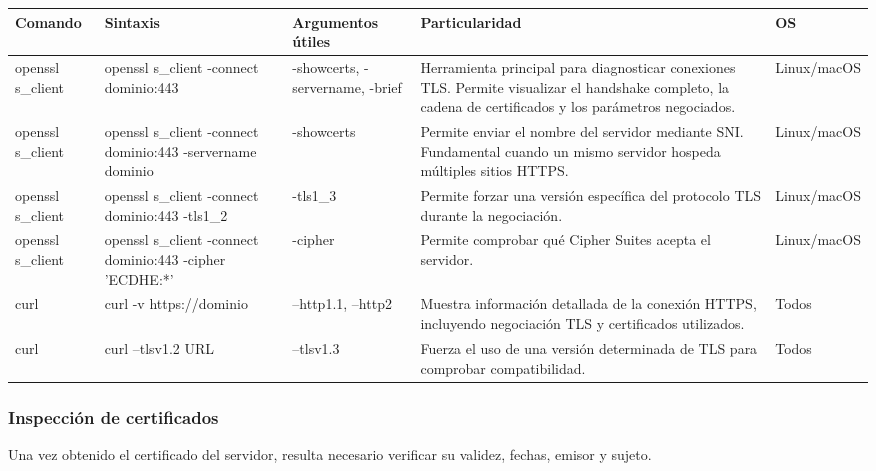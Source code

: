 \documentclass[a4paper,10pt]{article}
\begin{document}
\begin{longtable}{|p{2.8cm}|p{3cm}|p{4cm}|p{5.6cm}|p{1.5cm}|}

\hline
Comando &
Sintaxis &
Argumentos útiles &
Particularidad &
OS
\\
\hline
\endhead

openssl s\_client &
openssl s\_client -connect dominio:443 &
-showcerts, -servername, -brief &
Herramienta principal para diagnosticar conexiones TLS. Permite visualizar el handshake completo, la cadena de certificados y los parámetros negociados. &
Linux/macOS
\\
\hline

openssl s\_client &
openssl s\_client -connect dominio:443 -servername dominio &
-showcerts &
Permite enviar el nombre del servidor mediante SNI. Fundamental cuando un mismo servidor hospeda múltiples sitios HTTPS. &
Linux/macOS
\\
\hline

openssl s\_client &
openssl s\_client -connect dominio:443 -tls1\_2 &
-tls1\_3 &
Permite forzar una versión específica del protocolo TLS durante la negociación. &
Linux/macOS
\\
\hline

openssl s\_client &
openssl s\_client -connect dominio:443 -cipher 'ECDHE:*' &
-cipher &
Permite comprobar qué Cipher Suites acepta el servidor. &
Linux/macOS
\\
\hline

curl &
curl -v https://dominio &
--http1.1, --http2 &
Muestra información detallada de la conexión HTTPS, incluyendo negociación TLS y certificados utilizados. &
Todos
\\
\hline

curl &
curl --tlsv1.2 URL &
--tlsv1.3 &
Fuerza el uso de una versión determinada de TLS para comprobar compatibilidad. &
Todos
\\
\hline

\end{longtable}


\subsubsection{Inspección de certificados}

Una vez obtenido el certificado del servidor, resulta necesario verificar
su validez, fechas, emisor y sujeto.
\end{document}
